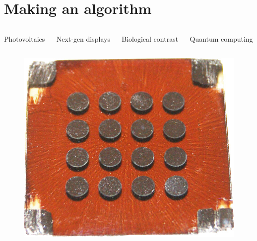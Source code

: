 \documentclass[aspectratio=169]{beamer}
\begin{document}
\section{Making an algorithm}

\begin{frame}
  \vspace{-1cm}
  \begin{columns}
    \begin{column}{0.25\textwidth}
      \begin{center}
        Photovoltaics
      \end{center}
    \end{column}

    \begin{column}{0.25\textwidth}
      \begin{center}
        Next-gen displays
      \end{center}
    \end{column}

    \begin{column}{0.25\textwidth}
      \begin{center}
        Biological contrast
      \end{center}
    \end{column}

    \begin{column}{0.25\textwidth}
      \begin{center}
        Quantum computing
      \end{center}
    \end{column}

  \end{columns}

  \begin{columns}
    \begin{column}{0.25\textwidth}
      \begin{figure}
        \includegraphics[width=\textwidth]{figures/devices/quantum_dot_solar_cell.jpg}
      \end{figure}
    \end{column}


\end{columns}
\end{frame}
\end{document}
